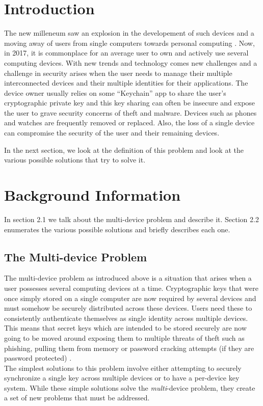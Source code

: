 \section{Introduction}

The new milleneum saw an explosion in the developement of such devices and a moving away of users from single computers towards personal computing \cite{Lyle2013}. Now, in 2017, it is commonplace for an average user to own and actively use several computing devices. With new trends and technology comes new challenges and a challenge in security arises when the user needs to manage their multiple interconnected devices and their multiple identities for their applications. The device owner usually relies on some ``Keychain'' app to share the user's cryptographic private key and this key sharing can often be insecure and expose the user to grave security concerns of theft and malware\cite{Atwater2016}. Devices such as phones and watches are frequently removed or replaced. Also, the loss of a single device can compromise the security of the user and their remaining devices.

In the next section, we look at the definition of this problem and look at the various possible solutions that try to solve it.

\section{Background Information}
In section 2.1 we talk about the multi-device problem and describe it. Section 2.2 enumerates the various possible solutions and briefly describes each one.

\subsection{The Multi-device Problem}
The multi-device problem as introduced above is a situation that arises when a user possesses several computing devices at a time. Cryptographic keys that were once simply stored on a single computer are now required by several devices and must somehow be securely distributed across these devices. Users need these to consistently authenticate themselves as single identity across multiple devices. This means that secret keys which are intended to be stored securely are now going to be moved around exposing them to multiple threats of theft such as phishing, pulling them from memory or password cracking attempts (if they are password protected) \cite{Atwater2016}.\\
The simplest solutions to this problem involve either attempting to securely synchronize a single key across multiple devices or to have a per-device key system. While these simple solutions solve the \emph{multi}-device problem, they create a set of new problems that must be addressed\cite{Atwater2016}.

